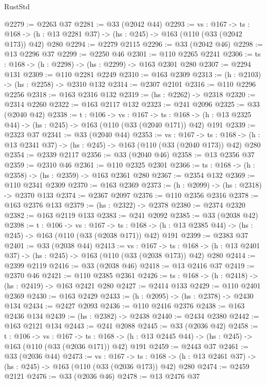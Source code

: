\begin{lexlean}{RustStd}
\begin{coremodule}
@2279 := @2263 @37
@2281 := @33 (@2042 @44)
@2293 := {vs : @167} ->
  {ts : @168} -> (h : @13 @2281 @37) -> (hs : @245) -> @163 (@110 (@33 (@2042 @173)) @42) @280
@2294 := @2279 @2115
@2296 := @33 (@2042 @46)
@2298 := @13 @2296 @37
@2299 := @2250 @46
@2301 := @110 @2265 @2241
@2306 := {ts : @168} -> (h : @2298) -> (hs : @2299) -> @163 @2301 @280
@2307 := @2294 @131
@2309 := @110 @2281 @2249
@2310 := @163 @2309
@2313 := (h : @2103) -> (hs : @2258) -> @2310 @132
@2314 := @2307 @2101
@2316 := @110 @2296 @2256
@2318 := @163 @2316 @132
@2319 := (hs : @2262) -> @2318
@2320 := @2314 @2260
@2322 := @163 @2117 @132
@2323 := @241 @2096
@2325 := @33 (@2040 @42)
@2338 := {t : @106} ->
  {vs : @167} ->
  {ts : @168} -> (h : @13 @2325 @44) -> (hs : @245) -> @163 (@110 (@33 (@2040 @171)) @42) @191
@2339 := @2323 @37
@2341 := @33 (@2040 @44)
@2353 := {vs : @167} ->
  {ts : @168} -> (h : @13 @2341 @37) -> (hs : @245) -> @163 (@110 (@33 (@2040 @173)) @42) @280
@2354 := @2339 @2117
@2356 := @33 (@2040 @46)
@2358 := @13 @2356 @37
@2359 := @2310 @46
@2361 := @110 @2325 @2301
@2366 := {ts : @168} -> (h : @2358) -> (hs : @2359) -> @163 @2361 @280
@2367 := @2354 @132
@2369 := @110 @2341 @2309
@2370 := @163 @2369
@2373 := (h : @2099) -> (hs : @2318) -> @2370 @133
@2374 := @2367 @2097
@2376 := @110 @2356 @2316
@2378 := @163 @2376 @133
@2379 := (hs : @2322) -> @2378
@2380 := @2374 @2320
@2382 := @163 @2119 @133
@2383 := @241 @2092
@2385 := @33 (@2038 @42)
@2398 := {t : @106} ->
  {vs : @167} ->
  {ts : @168} -> (h : @13 @2385 @44) -> (hs : @245) -> @163 (@110 (@33 (@2038 @171)) @42) @191
@2399 := @2383 @37
@2401 := @33 (@2038 @44)
@2413 := {vs : @167} ->
  {ts : @168} -> (h : @13 @2401 @37) -> (hs : @245) -> @163 (@110 (@33 (@2038 @173)) @42) @280
@2414 := @2399 @2119
@2416 := @33 (@2038 @46)
@2418 := @13 @2416 @37
@2419 := @2370 @46
@2421 := @110 @2385 @2361
@2426 := {ts : @168} -> (h : @2418) -> (hs : @2419) -> @163 @2421 @280
@2427 := @2414 @133
@2429 := @110 @2401 @2369
@2430 := @163 @2429
@2433 := (h : @2095) -> (hs : @2378) -> @2430 @134
@2434 := @2427 @2093
@2436 := @110 @2416 @2376
@2438 := @163 @2436 @134
@2439 := (hs : @2382) -> @2438
@2440 := @2434 @2380
@2442 := @163 @2121 @134
@2443 := @241 @2088
@2445 := @33 (@2036 @42)
@2458 := {t : @106} ->
  {vs : @167} ->
  {ts : @168} -> (h : @13 @2445 @44) -> (hs : @245) -> @163 (@110 (@33 (@2036 @171)) @42) @191
@2459 := @2443 @37
@2461 := @33 (@2036 @44)
@2473 := {vs : @167} ->
  {ts : @168} -> (h : @13 @2461 @37) -> (hs : @245) -> @163 (@110 (@33 (@2036 @173)) @42) @280
@2474 := @2459 @2121
@2476 := @33 (@2036 @46)
@2478 := @13 @2476 @37

\end{coremodule}
\end{lexlean}
